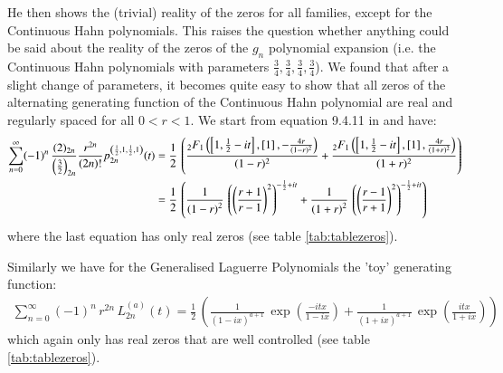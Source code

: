 \documentclass[a4paper,11pt,twoside]{amsart}
\newcommand{\verifiedeq}{=}
\newcommand{\verifiedeq}{\stackrel{\checkmark}{=}}
\begin{document}
\begin{itemize}
He then shows the (trivial) reality of the zeros for all families, except for the Continuous Hahn polynomials. This raises the question whether anything could be said about the reality of the zeros of the $g_n$ polynomial expansion (i.e. the Continuous Hahn polynomials with parameters $\frac34, \frac34, \frac34, \frac34$). We found that after a slight change of parameters, it becomes quite easy to show that all zeros of the alternating generating function of the Continuous Hahn polynomial are real and regularly spaced for all $0 < r < 1$. We start from equation 9.4.11 in \cite{koe} and have:
\begin{align}
\sum_{n=0}^\infty (-1)^n\, \frac{(2)_{2n}}{\left(\frac32\right)_{2n}}\frac{ r^{2n}}{(2n)!}p_{2n}^{\left(\frac12,1,\frac12,1\right)}(t) &\verifiedeq \frac12\,\left(\frac{{}_2F_1\left(\left[1,\frac12-it\right],\left[1\right], -\frac{4r}{(1-r)^2}\right)}{(1-r)^2}+\frac{{}_2F_1\left(\left[1,\frac12-it\right],\left[1\right], \frac{4r}{(1+r)^2}\right)}{(1+r)^2} \right) \\
 & \verifiedeq \frac12\, \left(\frac{1}{\left(1-r \right)^{2}}\,\left(\left(\dfrac{r+1}{r -1}\right)^{2}\right)^{-\frac{1}{2}+it}+\frac{1}{{\left(1+r \right)^{2}}}\,\left(\left(\dfrac{r -1}{r+1}\right)^{2}\right)^{-\frac{1}{2}+it}\right) \notag
\end{align}
where the last equation has only real zeros (see table \ref{tab:tablezeros}).

Similarly we have for the Generalised Laguerre Polynomials the 'toy' generating function:
\begin{align}
\sum_{n=0}^\infty (-1)^n\,r^{2n} \,L_{2n}^{\left(a\right)}(t) \verifiedeq \frac12\,\left(\frac{1}{(1-ix)^{a+1}}\,\displaystyle \exp\left(\frac{-itx}{1-ix}\right)+\frac{1}{(1+ix)^{a+1}}\, \exp\left(\frac{itx}{1+ix}\right)\right)
\end{align}
which again only has real zeros that are well controlled (see table \ref{tab:tablezeros}).


\end{itemize}
\end{document}

